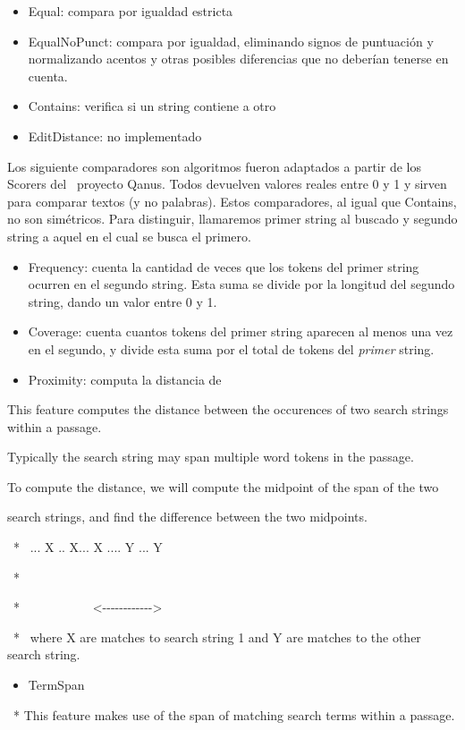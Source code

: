 \begin{itemize}
\item Equal: compara por igualdad estricta
\item EqualNoPunct: compara por igualdad, eliminando signos de
puntuaci\'on y normalizando acentos y otras posibles diferencias que no
deber\'ian tenerse en cuenta.
\item Contains: verifica si un string contiene a otro
\item EditDistance: no implementado
\end{itemize}
Los siguiente comparadores son algoritmos fueron adaptados a partir de
los Scorers del \ proyecto Qanus. Todos devuelven valores reales entre
0 y 1 y sirven para comparar textos (y no palabras). Estos
comparadores, al igual que Contains, no son sim\'etricos. Para
distinguir, llamaremos primer string al buscado y segundo string a
aquel en el cual se busca el primero. 


\begin{itemize}
\item Frequency: cuenta la cantidad de veces que los tokens del primer
string ocurren en el segundo string. Esta suma se divide por la
longitud del segundo string, dando un valor entre 0 y 1.
\item Coverage: cuenta cuantos tokens del primer string aparecen al
menos una vez en el segundo, y divide esta suma por el total de tokens
del \textit{primer} string.
\item Proximity: computa la distancia de 
\end{itemize}
This feature computes the distance between the occurences of two search
strings within a passage.

Typically the search string may span multiple word tokens in the
passage. 

To compute the distance, we will compute the midpoint of the span of the
two

search strings, and find the difference between the two midpoints. 

\ * \ ... X .. X... X .... Y ... Y

\ * \ \ \ \ \ \ \ \ \ \ {\textbar} \ \ \ \ \ \ \ \ \ \ \ \ \ {\textbar}

\ *
\ \ \ \ \ \ \ \ \ \ \ {\textless}-{}-{}-{}-{}-{}-{}-{}-{}-{}-{}-{}-{\textgreater}

\ * \ where X are matches to search string 1 and Y are matches to the
other search string.


\begin{itemize}
\item TermSpan
\end{itemize}
\ * This feature makes use of the span of matching search terms within a
passage.


